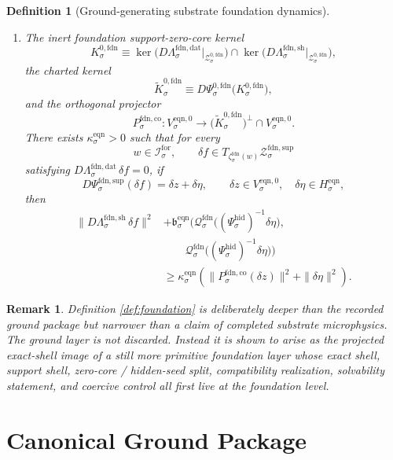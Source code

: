 \documentclass[11pt]{article}
\newcommand{\ForSpace}[1]{\mathcal I_{#1}^{\mathrm{for}}}
\newcommand{\HiddenChart}[1]{\Psi_{#1}^{\mathrm{hid}}}
\newcommand{\FoundData}[1]{\Lambda_{#1}^{\mathrm{fdn,dat}}}
\newcommand{\FoundShellMap}[1]{\Lambda_{#1}^{\mathrm{fdn,sh}}}
\newcommand{\FoundSupportShell}[1]{\mathcal Z_{#1}^{\mathrm{fdn,sup}}}
\newcommand{\FoundZeroCore}[1]{\mathcal Z_{#1}^{0,\mathrm{fdn}}}
\newcommand{\FoundEqChart}[1]{\Psi_{#1}^{\mathrm{fdn,sup}}}
\newcommand{\FoundZeroChart}[1]{\Psi_{#1}^{0,\mathrm{fdn}}}
\newcommand{\FoundCharge}[1]{\mathcal Q_{#1}^{\mathrm{fdn}}}
\newcommand{\FoundEmbed}[1]{\zeta_{#1}^{\mathrm{fdn}}}
\newcommand{\FoundKernel}[1]{K_{#1}^{0,\mathrm{fdn}}}
\newcommand{\FoundKernelCh}[1]{\widetilde K_{#1}^{0,\mathrm{fdn}}}
\newcommand{\FoundStateComp}[1]{P_{#1}^{\mathrm{fdn,co}}}
\newcommand{\EqnPair}[1]{\mathfrak b_{#1}^{\mathrm{eqn}}}
\newcommand{\EqnHidden}[1]{H_{#1}^{\mathrm{eqn}}}
\newcommand{\EqnZero}[1]{V_{#1}^{\mathrm{eqn},0}}
\newtheorem{definition}{Definition}
\newtheorem{remark}{Remark}
\begin{document}
\begin{definition}[Ground-generating substrate foundation dynamics]
\begin{enumerate}
    \item The inert foundation support-zero-core kernel
    \[
    \FoundKernel{\sigma}
    \equiv
    \ker\bigl(D\FoundData{\sigma}\big|_{\FoundZeroCore{\sigma}}\bigr)
    \cap
    \ker\bigl(D\FoundShellMap{\sigma}\big|_{\FoundZeroCore{\sigma}}\bigr),
    \]
    the charted kernel
    \[
    \FoundKernelCh{\sigma}
    \equiv
    D\FoundZeroChart{\sigma}\bigl(\FoundKernel{\sigma}\bigr),
    \]
    and the orthogonal projector
    \[
    \FoundStateComp{\sigma}:
    \EqnZero{\sigma}\to
    \bigl(\FoundKernelCh{\sigma}\bigr)^{\perp}\cap\EqnZero{\sigma}.
    \]
    There exists \(\kappa_{\sigma}^{\mathrm{eqn}}>0\) such that for every
    \[
    w\in\ForSpace{\sigma},
    \qquad
    \delta f\in T_{\FoundEmbed{\sigma}(w)}\FoundSupportShell{\sigma}
    \]
    satisfying \(D\FoundData{\sigma}\,\delta f=0\), if
    \[
    D\FoundEqChart{\sigma}(\delta f)=\delta z+\delta\eta,
    \qquad
    \delta z\in\EqnZero{\sigma},
    \quad
    \delta\eta\in\EqnHidden{\sigma},
    \]
    then
    \begin{equation}
    \begin{aligned}
    \|D\FoundShellMap{\sigma}\,\delta f\|^{2}
    &+
    \EqnPair{\sigma}\bigl(
    \FoundCharge{\sigma}\bigl((\HiddenChart{\sigma})^{-1}\delta\eta\bigr),\\
    &\qquad
    \FoundCharge{\sigma}\bigl((\HiddenChart{\sigma})^{-1}\delta\eta\bigr)
    \bigr)
    \\
    &\ge
    \kappa_{\sigma}^{\mathrm{eqn}}
    \left(
    \|\FoundStateComp{\sigma}(\delta z)\|^{2}
    +
    \|\delta\eta\|^{2}
    \right).
    \end{aligned}
    \label{eq:foundcoercive}
    \end{equation}
\end{enumerate}
\end{definition}

\begin{remark}
Definition \ref{def:foundation} is deliberately deeper than the recorded ground package but narrower than a claim of completed substrate microphysics. The ground layer is not discarded. Instead it is shown to arise as the projected exact-shell image of a still more primitive foundation layer whose exact shell, support shell, zero-core / hidden-seed split, compatibility realization, solvability statement, and coercive control all first live at the foundation level.
\end{remark}

\section{Canonical Ground Package}
\end{document}
